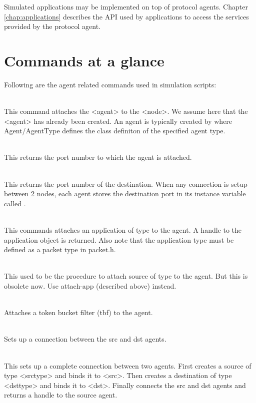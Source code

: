 Simulated applications may be implemented on top of protocol agents.  Chapter
\ref{chap:applications} describes the API used by applications to  access the 
services provided by the protocol agent.

\section{Commands at a glance}
\label{sec:agentscommand}

Following are the agent related commands used in simulation scripts:
\begin{flushleft}
\\
This command attaches the <agent> to the <node>. We assume here that the
<agent> has already been created. An agent is typically created by
where Agent/AgentType defines the class definiton of the specified agent
type.


\\
This returns the port number to which the agent is attached.


\\
This returns the port number of the destination.
When any connection is setup between 2 nodes, each agent stores the 
destination port in its instance variable called .


\\
This commands attaches an application of type  to the agent.
A handle to the application object is returned. Also note that the application
type must be defined as a packet type in packet.h.


\\
This used to be the procedure to attach source of type  to
the agent. But this is obsolete now. Use attach-app (described above)
instead.


\\
Attaches a token bucket filter (tbf) to the agent.


\\
Sets up a connection between the src and dst agents. 


\\
This sets up a complete connection between two agents. First creates a source
of type <srctype> and binds it to <src>. Then creates a destination of type
<dsttype> and binds it to <dst>. Finally connects the src and dst agents and
returns a handle to the source agent.



\end{flushleft}
